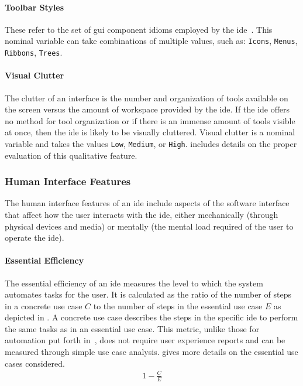 \paragraph{Toolbar Styles}
These refer to the set of \ac{gui} component idioms employed by the \ac{ide}~\cite{galitz2007}.
This nominal variable can take combinations of multiple values, such as:
\texttt{Icons}, \texttt{Menus}, \texttt{Ribbons}, \texttt{Trees}.


\paragraph{Visual Clutter}
The clutter of an interface is the number and organization of tools available on the screen versus the amount of workspace provided by the \ac{ide}.
If the \ac{ide} offers no method for tool organization or if there is an immense amount of tools visible at once, then the \ac{ide} is likely to be visually cluttered.
Visual clutter is a nominal variable and takes the values \texttt{Low}, \texttt{Medium}, or \texttt{High}.
 includes details on the proper evaluation of this qualitative feature.


\subsubsection{Human Interface Features} \label{subsubsec:humaninterface}

The human interface features of an \ac{ide} include aspects of the software
interface that affect how the user interacts with the \ac{ide}, either
mechanically (\eg through physical devices and media) or mentally (\eg the
mental load required of the user to operate the \ac{ide}).


\paragraph{Essential Efficiency}
The essential efficiency of an \ac{ide} measures the level to which the system automates tasks for the user.
It is calculated as the ratio of the number of steps in a concrete use case $C$ to the number of steps in the essential use case $E$ as depicted in .
A concrete use case describes the steps in the specific \ac{ide} to perform the same tasks as in an essential use case.
This metric, unlike those for automation put forth in~\cite{wei1998}, does not require user experience reports and can be measured through simple use case analysis.
 gives more details on the essential use cases considered.
%
\begin{align}\label{eq:eefficiency}
  1 - \frac{C}{E}
\end{align}


